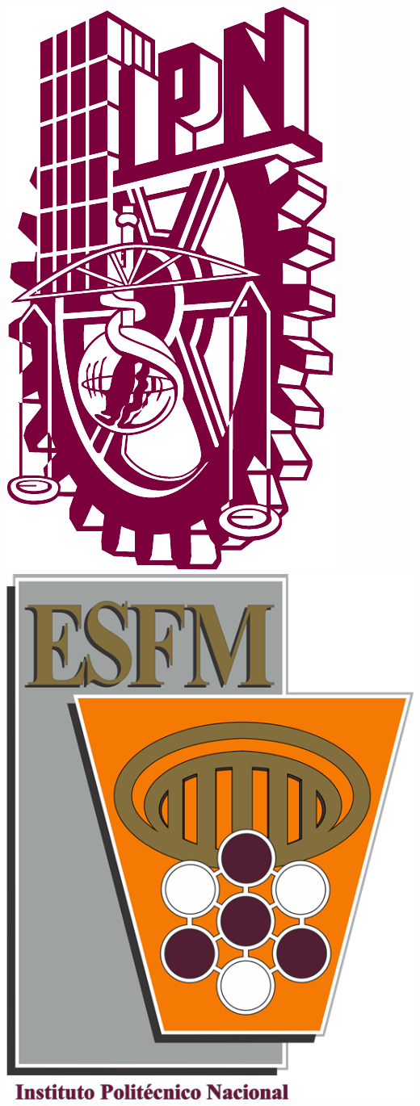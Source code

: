 \documentclass[10pt]{beamer}
\newtheorem{final remarks}{final remarks}[section]
\newtheorem{future work collaboration}{future work collaboration}[section]
\begin{document}
\begin{frame}
\includegraphics[scale=0.08]{Img/ipn4.png}
\hfill
\includegraphics[scale=0.3]{Img/esfm4.png}

\end{frame}
\end{document}
